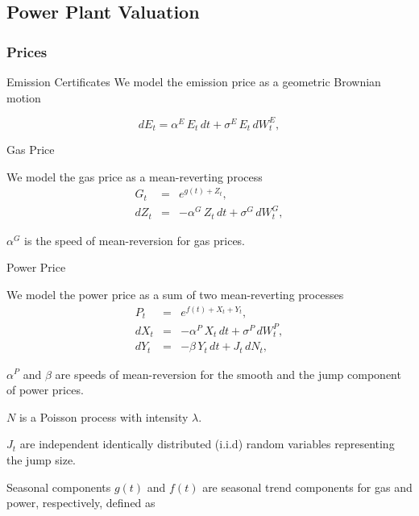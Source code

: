 \subsection{Power Plant Valuation}
\subsubsection{Prices}

{ Emission Certificates}
We model the emission price as a geometric Brownian motion

\begin{equation}
d{E}_t = \alpha^E\,E_t\,d{t} + \sigma^E\,E_t\,d{W}^E_t,
\label{co2}
\end{equation}

{Gas Price}


	We model the gas price as a mean-reverting process
\begin{eqnarray}
G_t & = & e^{g(t) + Z_t},  \nonumber \\
d{Z}_t & = & -\alpha^G\,Z_t\,d{t} + \sigma^G\,d{W}^G_t,
\label{gas}
\end{eqnarray}

	$\alpha^G$ is the speed of mean-reversion for gas prices.


{Power Price}


	We model the power price as a sum of two mean-reverting processes
\begin{eqnarray}
P_t & = & e^{f(t) + X_t + Y_t},  \nonumber \\
d{X}_t & = & -\alpha^P\,X_t\,d{t} + \sigma^P\,d{W}^P_t, \nonumber \\
d{Y}_t & = & -\beta\,Y_t\,d{t} + J_t\,d{N}_t,
\label{power}
\end{eqnarray}

	$\alpha^P$ and $\beta$ are speeds of mean-reversion for the smooth and the jump component of power prices.

	$N$ is a Poisson process with intensity $\lambda$.

	$J_t$ are independent identically distributed (i.i.d) random variables representing the jump size.


{Seasonal components}
$g(t)$ and $f(t)$ are seasonal trend components for gas and power, respectively, defined as

